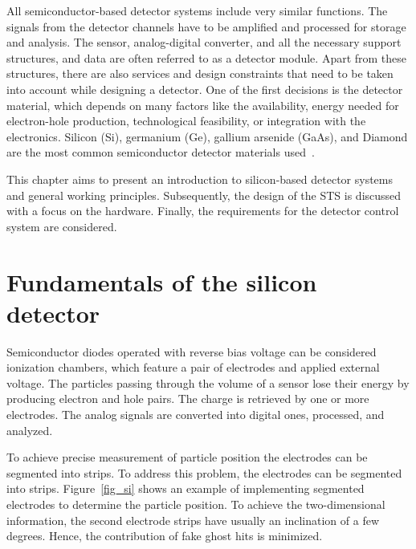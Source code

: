 
All semiconductor-based detector systems include very similar functions. The signals from the detector channels have to be amplified and processed for storage and analysis. The sensor, analog-digital converter, and all the necessary support structures, and data  are often referred to as a detector module. Apart from these structures, there are also services and design constraints that need to be taken into account while designing a detector. One of the first decisions is the detector material, which depends on many factors like the availability, energy needed for electron-hole production, technological feasibility, or integration with the electronics. Silicon (Si), germanium (Ge), gallium arsenide (GaAs), and Diamond are the most common semiconductor detector materials used~\cite{Lutz:1999wg,Hartmann:2017gzy}.


This chapter aims to present an introduction to silicon-based detector systems and general working principles. Subsequently, the design of the \gls{STS} is discussed with a focus on the hardware. Finally, the requirements for the detector control system are considered. 

\section{Fundamentals of the silicon detector}
Semiconductor diodes operated with reverse bias voltage can be considered ionization chambers, which feature a pair of electrodes and applied external voltage. The particles passing through the volume of a sensor lose their energy by producing electron and hole pairs. The charge is retrieved by one or more electrodes. The analog signals are converted into digital ones, processed, and analyzed.

To achieve precise measurement of particle position the electrodes can be segmented into strips. To address this problem, the electrodes can be segmented into strips. Figure~\ref{fig_si} shows an example of implementing segmented electrodes to determine the particle position. To achieve the two-dimensional information, the second electrode strips have usually an inclination of a few degrees. Hence, the contribution of fake ghost hits is minimized.  


